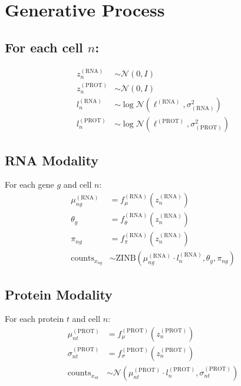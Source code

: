 \documentclass{article}
\begin{document}
\section*{Generative Process}

\subsection*{For each cell $n$:}
\begin{align*}
z_n^{(\text{RNA})} &\sim \mathcal{N}(0, I) \\
z_n^{(\text{PROT})} &\sim \mathcal{N}(0, I) \\
l_n^{(\text{RNA})} &\sim \log \mathcal{N}(\ell^{(\text{RNA})}, \sigma^2_{(\text{RNA})}) \\
l_n^{(\text{PROT})} &\sim \log \mathcal{N}(\ell^{(\text{PROT})}, \sigma^2_{(\text{PROT})})
\end{align*}

\subsection*{RNA Modality}
For each gene $g$ and cell $n$:
\begin{align*}
\mu_{ng}^{(\text{RNA})} &= f_\mu^{(\text{RNA})}(z_n^{(\text{RNA})}) \\
\theta_g &= f_\theta^{(\text{RNA})}(z_n^{(\text{RNA})}) \\
\pi_{ng} &= f_\pi^{(\text{RNA})}(z_n^{(\text{RNA})}) \\
\text{counts}_{x_{ng}} &\sim \text{ZINB}(\mu_{ng}^{(\text{RNA})} \cdot l_n^{(\text{RNA})}, \theta_g, \pi_{ng})
\end{align*}

\subsection*{Protein Modality}
For each protein $t$ and cell $n$:
\begin{align*}
\mu_{nt}^{(\text{PROT})} &= f_\mu^{(\text{PROT})}(z_n^{(\text{PROT})}) \\
\sigma_{nt}^{(\text{PROT})} &= f_\sigma^{(\text{PROT})}(z_n^{(\text{PROT})}) \\
\text{counts}_{x_{nt}} &\sim \mathcal{N}(\mu_{nt}^{(\text{PROT})} \cdot l_n^{(\text{PROT})}, \sigma_{nt}^{(\text{PROT})})
\end{align*}
\end{document}
